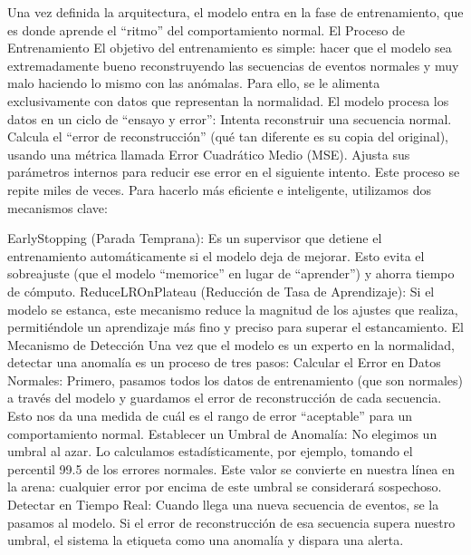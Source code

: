 \begin{enumerate}
\begin{enumerate}
                        Una vez definida la arquitectura, el modelo entra en la fase de entrenamiento, que es donde aprende el ``ritmo'' del comportamiento normal.
                        El Proceso de Entrenamiento
                        El objetivo del entrenamiento es simple: hacer que el modelo sea extremadamente bueno reconstruyendo las secuencias de eventos normales y muy malo haciendo lo mismo con las anómalas. Para ello, se le alimenta exclusivamente con datos que representan la normalidad.
                        El modelo procesa los datos en un ciclo de ``ensayo y error'':
                        Intenta reconstruir una secuencia normal.
                        Calcula el ``error de reconstrucción'' (qué tan diferente es su copia del original), usando una métrica llamada Error Cuadrático Medio (MSE).
                        Ajusta sus parámetros internos para reducir ese error en el siguiente intento.
                        Este proceso se repite miles de veces. Para hacerlo más eficiente e inteligente, utilizamos dos mecanismos clave:

                        EarlyStopping (Parada Temprana): Es un supervisor que detiene el entrenamiento automáticamente si el modelo deja de mejorar. Esto evita el sobreajuste (que el modelo ``memorice'' en lugar de ``aprender'') y ahorra tiempo de cómputo.
                        ReduceLROnPlateau (Reducción de Tasa de Aprendizaje): Si el modelo se estanca, este mecanismo reduce la magnitud de los ajustes que realiza, permitiéndole un aprendizaje más fino y preciso para superar el estancamiento.
                        El Mecanismo de Detección
                        Una vez que el modelo es un experto en la normalidad, detectar una anomalía es un proceso de tres pasos:
                        Calcular el Error en Datos Normales: Primero, pasamos todos los datos de entrenamiento (que son normales) a través del modelo y guardamos el error de reconstrucción de cada secuencia. Esto nos da una medida de cuál es el rango de error ``aceptable'' para un comportamiento normal.
                        Establecer un Umbral de Anomalía: No elegimos un umbral al azar. Lo calculamos estadísticamente, por ejemplo, tomando el percentil 99.5 de los errores normales. Este valor se convierte en nuestra línea en la arena: cualquier error por encima de este umbral se considerará sospechoso.
                        Detectar en Tiempo Real: Cuando llega una nueva secuencia de eventos, se la pasamos al modelo. Si el error de reconstrucción de esa secuencia supera nuestro umbral, el sistema la etiqueta como una anomalía y dispara una alerta.
            \end{enumerate}
\end{enumerate}

